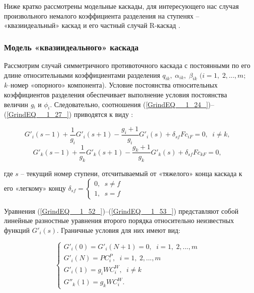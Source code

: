 Ниже кратко рассмотрены модельные каскады, для интересующего нас случая произвольного немалого коэффициента разделения на ступенях -- «квазиидеальный» каскад и его частный случай R-каскад \cite{sazykinKvaziidealnyeKaskadyDlya2000}.

\subsubsection{Модель «квазиидеального» каскада}

Рассмотрим случай симметричного противоточного каскада с постоянными по его длине относительными коэффициентами разделения $q_{ik} ,\; \alpha _{ik} ,\; \beta _{ik} $ $(i=1,\; 2,...,m;$ \textit{k}--номер «опорного» компонента). Условие постоянства относительных коэффициентов разделения обеспечивает выполнение условия постоянства величин \textit{g${}_{i}$} и $\phi _{i} $. Следовательно, соотношения (\ref{GrindEQ__1_24_})--(\ref{GrindEQ__1_27_}) приводятся к виду \cite{sulaberidzeTeoriyaKaskadovDlya2011}:

\begin{equation} \label{GrindEQ__1_52_} 
  G'_{i} (s-1)+\frac{1}{g_{i} } G'_{i} (s+1)-\frac{g_{i} +1}{g_{i} } G'_{i} (s)+\delta _{sf} Fc_{iF} =0,\; \; i\ne k, 
  \end{equation} 
  \begin{equation} \label{GrindEQ__1_53_} 
  G'_{k} (s-1)+\frac{1}{g_{k} } G'_{k} (s+1)-\frac{g_{k} +1}{g_{k} } G'_{k} (s)+\delta _{sf} Fc_{kF} =0, 
  \end{equation}

где $s$ – текущий номер ступени, отсчитываемый от «тяжелого» конца каскада к его «легкому» концу $\delta _{sf} =\left\{\begin{array}{l} {0,\; \; s\ne f} \\ {1,\; \; s=f} \end{array}\right. $

Уравнения (\ref{GrindEQ__1_52_})--(\ref{GrindEQ__1_53_}) представляют собой линейные разностные уравнения второго порядка относительно неизвестных функций $G'_{i} (s)$. Граничные условия для них имеют вид:

\begin{equation} \label{GrindEQ__1_54_} 
  \left\{\begin{array}{l} {G'_{i} (0)=G'_{i} (N+1)=0,\; \; i=1,\; 2,...,m} \\ {G'_{i} (N)=PC_{i}^{P} ,\; \; i=1,\; 2,...,m} \\ {G'_{i} (1)=g_{i} WC_{i}^{W} ,\; \; i\ne k} \\ {G''_{k} (1)=g_{k} WC_{i}^{W} .} \end{array}\right.  
\end{equation} 

